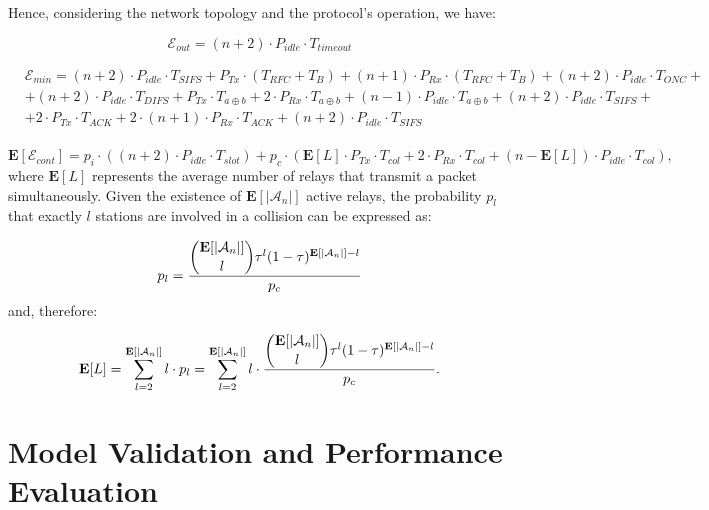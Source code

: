 \documentclass[12pt,draftcls, onecolumn]{IEEEtran}
\begin{document}
Hence, considering the network topology and the protocol's operation, we have:

\begin{equation}
\label{eq:Eout}
 	\mathcal{E}_{out}=(n+2)\cdot P_{idle}\cdot T_{timeout}
\end{equation}

\footnotesize
\begin{equation}
\label{eq:Emin}
\begin{aligned}
&\mathcal{E}_{min}=(n+2)\cdot P_{idle}\cdot T_{SIFS}+P_{Tx}\cdot (T_{RFC}+T_B)+(n+1)\cdot P_{Rx}\cdot(T_{RFC}+T_B)+(n+2)\cdot P_{idle}\cdot T_{ONC}+\\
&+(n+2)\cdot P_{idle}\cdot T_{DIFS}+P_{Tx}\cdot T_{a\oplus b}+2\cdot P_{Rx} \cdot T_{a\oplus b}+(n-1)\cdot P_{idle}\cdot T_{a\oplus b}+(n+2)\cdot P_{idle}\cdot T_{SIFS}+\\
&+2\cdot P_{Tx}\cdot T_{ACK}+2\cdot (n+1)\cdot P_{Rx}\cdot T_{ACK}+(n+2)\cdot P_{idle} \cdot T_{SIFS}\\
\end {aligned}
\end{equation}
\normalsize

\begin{equation}
\label{eq:Econt}
 	\mathbf{E}[\mathcal{E}_{cont}]=p_i\cdot ((n+2)\cdot P_{idle}\cdot T_{slot})+p_c\cdot (\mathbf{E}[L]\cdot P_{Tx}\cdot T_{col}+2\cdot P_{Rx}\cdot T_{col}+(n-\mathbf{E}[L])\cdot P_{idle}\cdot T_{col}),
\end{equation}
where $\mathbf{E}[L]$ represents the average number of relays that transmit a packet simultaneously. Given the existence of $\mathbf{E}[|\mathcal{A}_n|]$ active relays, the probability $p_l$ that exactly $l$ stations are involved in a collision can be expressed as:

\begin{equation}
\label{eq:pk}
 	p_l=\frac{\dbinom{\mathbf{E}[|\mathcal{A}_n|]}{l}\tau^{l}(1-\tau)^{\mathbf{E}[|\mathcal{A}_n|]-l}}{p_c}
\end{equation}
and, therefore:

\begin{equation}
\label{eq:Ek}
 	\mathbf{E}[L]=\displaystyle\sum_{l=2}^{\mathbf{E}[|\mathcal{A}_n|]}l\cdot p_{l}=\displaystyle\sum_{l=2}^{\mathbf{E}[|\mathcal{A}_n|]}l\cdot\frac{\dbinom{\mathbf{E}[|\mathcal{A}_n|]}{l}\tau^{l}(1-\tau)^{\mathbf{E}[|\mathcal{A}_n|]-l}}{p_c}.
\end{equation}


\section{Model Validation and Performance Evaluation}
\label{sec:performance}
\end{document}
